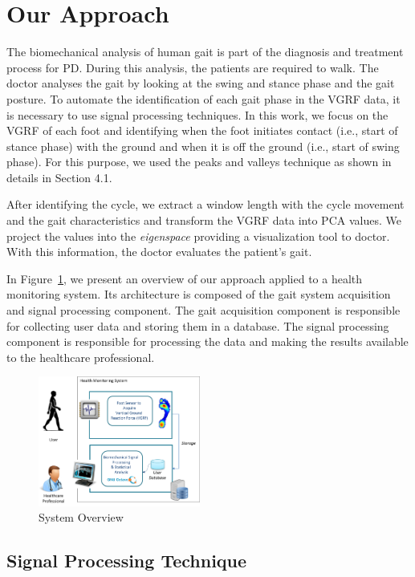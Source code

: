 \documentclass[10pt, conference, compsocconf]{IEEEtran}
\begin{document}
\section{Our Approach}
\label{sec:overview}
The biomechanical analysis of human gait is part of the diagnosis and treatment process for PD. During this analysis, the patients are required to walk. The doctor analyses the gait by looking at the swing and stance phase and the gait posture. To automate the identification of each gait phase in the VGRF data, it is necessary to use signal processing techniques. In this work, we focus on the VGRF of each foot and identifying when the foot initiates contact (i.e., start of stance phase) with the ground and when it is off the ground (i.e., start of swing phase). For this purpose, we used the peaks and valleys technique as shown in details in Section 4.1.

After identifying the cycle, we extract a window length with the cycle movement and the gait characteristics and transform the VGRF data into PCA values. We project the values into the \textit{eigenspace} providing a visualization tool to doctor. With this information, the doctor evaluates the patient's gait.

In Figure~\ref{img:sysarch}, we present an overview of our approach applied to a health monitoring system. Its architecture is composed of the gait system acquisition and signal processing component. The gait acquisition component is responsible for collecting user data and storing them in a database. The signal processing component is responsible for processing the data and making the results available to the healthcare professional.


\begin{figure}[!htb]
	\centering
	\includegraphics[width=0.475\textwidth]{img/systemoverview.png}
	\caption{System Overview}
	\label{img:sysarch}
\end{figure}

\subsection{Signal Processing Technique}
\end{document}
